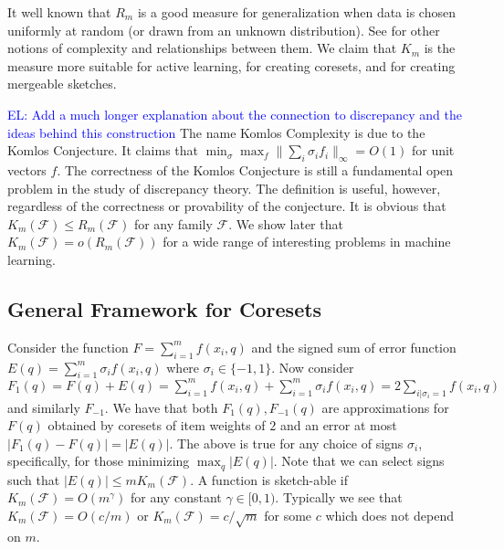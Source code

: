 \documentclass[anon,12pt]{colt2019} %
\newcommand{\el}[1]{\textcolor{blue}{EL: #1}}
\newcommand{\eps}{\epsilon}
\newcommand{\F}{\mathcal{F}}
\begin{document}
\noindent It well known that $R_m$ is a good measure for generalization when data is chosen uniformly at random (or drawn from an unknown distribution). See \cite{Bartlett:2003:RGC:944919.944944} for other notions of complexity and relationships between them. We claim that $K_m$ is the measure more suitable for active learning, for creating coresets, and for creating mergeable sketches.

\el{Add a much longer explanation about the connection to discrepancy and the ideas behind this construction} The name Komlos Complexity is due to the Komlos Conjecture. It claims that $\min_\sigma \max_f \|\sum_i \sigma_i f_i\|_\infty = O(1)$ for unit vectors $f$. The correctness of the Komlos Conjecture is still a fundamental open problem in the study of discrepancy theory.  The definition is useful, however, regardless of the correctness or provability of the conjecture.  
It is obvious that  $K_m(\F) \le R_m(\F)$ for any family $\F$. We show later that $K_m(\F) = o(R_m(\F))$ for a wide range of interesting problems in machine learning.


\subsection{General Framework for Coresets}
Consider the function $F = \sum_{i=1}^{m} f(x_i,q)$ and the signed sum of error function $E(q) = \sum_{i=1}^{m} \sigma_i f(x_i,q)$ where $\sigma_i \in \{-1,1\}$.
Now consider $F_1(q) = F(q) + E(q) = \sum_{i=1}^{m} f(x_i,q)  + \sum_{i=1}^{m} \sigma_i f(x_i,q)  = 2 \sum_{i | \sigma_i=1} f(x_i,q)$ and similarly $F_{-1}$. We have that both $F_1(q), F_{-1}(q)$ are approximations for $F(q)$ obtained by coresets of item weights of $2$ and an error at most $|F_1(q) - F(q)| =  |E(q)|$.
%
The above is true for any choice of signs $\sigma_i$, specifically, for those minimizing $\max_q | E(q)|$.
Note that we can select signs such that $|E(q)| \le m K_m(\F)$.
A function is sketch-able if $K_m(\F) = O(m^\gamma)$ for any constant $\gamma \in [0,1)$.
Typically we see that $K_m(\F) = O(c/m)$ or $K_m(\F)= c/\sqrt{m}$ for some $c$ which does not depend on $m$.
\end{document}
